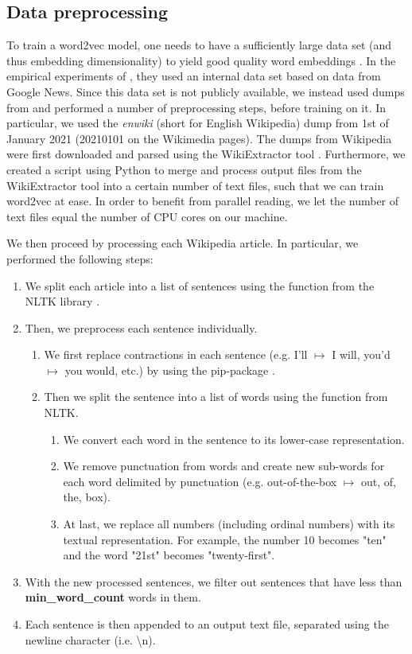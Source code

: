 \subsection{Data preprocessing}
\label{sec:word2vec-data-preprocessing}
To train a word2vec model, one needs to have a sufficiently large data set (and thus embedding dimensionality) to yield good quality word embeddings \cite{mikolov2013b}. In the empirical experiments of \cite{mikolov2013b}, they used an internal data set based on data from Google News. Since this data set is not publicly available, we instead used dumps from \cite{WikimediaDumps} and performed a number of preprocessing steps, before training on it. In particular, we used the \textit{enwiki} (short for English Wikipedia) dump from 1st of January 2021 (20210101 on the Wikimedia pages). The dumps from Wikipedia were first downloaded and parsed using the WikiExtractor tool \cite{Wikiextractor2015}. Furthermore, we created a script using Python to merge and process output files from the WikiExtractor tool into a certain number of text files, such that we can train word2vec at ease. In order to benefit from parallel reading, we let the number of text files equal the number of CPU cores on our machine.

We then proceed by processing each Wikipedia article. In particular, we performed the following steps:
\begin{enumerate}
    \item We split each article into a list of sentences using the  function from the NLTK library \cite{bird2009natural}.
    \item Then, we preprocess each sentence individually.
    \begin{enumerate}
        \item We first replace contractions in each sentence (e.g. I'll $\mapsto$ I will, you'd $\mapsto$ you would, etc.) by using the  pip-package \cite{contractions-2016}.
        \item Then we split the sentence into a list of words using the  function from NLTK.
        \begin{enumerate}
            \item We convert each word in the sentence to its lower-case representation.
            \item We remove punctuation from words and create new sub-words for each word delimited by punctuation (e.g. out-of-the-box $\mapsto$ out, of, the, box).
            \item At last, we replace all numbers (including ordinal numbers) with its textual representation. For example, the number 10 becomes "ten" and the word "21st" becomes "twenty-first".
        \end{enumerate}
    \end{enumerate}
    \item With the new processed sentences, we filter out sentences that have less than \textbf{min\_word\_count} words in them.
    \item Each sentence is then appended to an output text file, separated using the newline character (i.e. \textbackslash n).
\end{enumerate}


